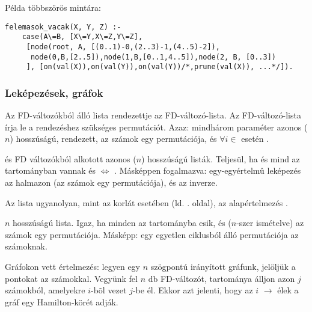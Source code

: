 Példa többszörös mintára: 

\begin{verbatim}
felemasok_vacak(X, Y, Z) :-
    case(A\=B, [X\=Y,X\=Z,Y\=Z],
     [node(root, A, [(0..1)-0,(2..3)-1,(4..5)-2]),
      node(0,B,[2..5]),node(1,B,[0..1,4..5]),node(2, B, [0..3])
     ], [on(val(X)),on(val(Y)),on(val(Y))/*,prune(val(X)), ...*/]).
\end{verbatim}

\subsubsection{Leképezések, gráfok}

{}

Az  FD-változókból álló lista rendezettje az  FD-változó-lista. Az 
FD-változó-lista írja le a rendezéshez szükséges permutációt. Azaz: mindhárom
paraméter azonos ($n$) hosszúságú,  rendezett,  az  számok
egy permutációja, és $\forall i \in$  esetén . 

\medskip

{}

 és  FD változókból alkotott azonos ($n$) hosszúságú listák. Teljesül,
ha  és  mind az  tartományban vannak és  
$\Leftrightarrow$ . Másképpen fogalmazva:  egy-egyértelmû
leképezés az  halmazon (az  számok egy permutációja), és
 az  inverze.

Az  lista ugyanolyan, mint az  korlát
esetében (ld. \pageref{all_distinct}. oldal), az alapértelmezés
.

\medskip

{ }

 $n$ hosszúságú lista. Igaz, ha minden  az 
tartományba esik, és 
($n$-szer ismételve) az  számok egy permutációja. Másképp:  egy
egyetlen ciklusból álló permutációja az  számoknak.

Gráfokon vett értelmezés: legyen egy $n$ szögpontú irányított gráfunk,
jelöljük a pontokat az  számokkal. Vegyünk fel $n$ db FD-változót,
 tartománya álljon azon $j$ számokból, amelyekre $i$-bõl vezet $j$-be él.
Ekkor  azt jelenti, hogy az $i$ $\rightarrow$  élek a
gráf egy Hamilton-körét adják.

